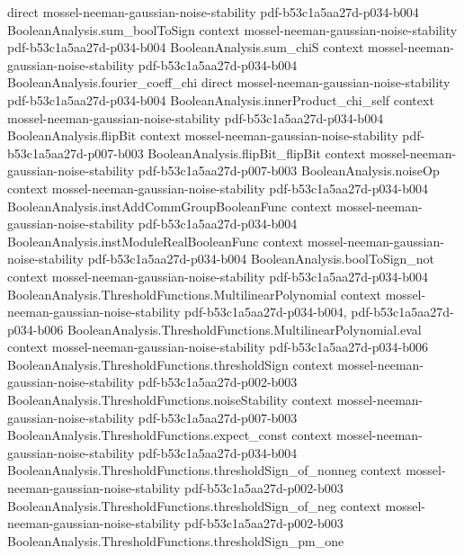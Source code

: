 \begin{theorem}
  {direct}
  {mossel-neeman-gaussian-noise-stability}
  {pdf-b53c1a5aa27d-p034-b004}
\proofstep
  {BooleanAnalysis.sum_boolToSign}
  {context}
  {mossel-neeman-gaussian-noise-stability}
  {pdf-b53c1a5aa27d-p034-b004}
\proofstep
  {BooleanAnalysis.sum_chiS}
  {context}
  {mossel-neeman-gaussian-noise-stability}
  {pdf-b53c1a5aa27d-p034-b004}
\proofstep
  {BooleanAnalysis.fourier_coeff_chi}
  {direct}
  {mossel-neeman-gaussian-noise-stability}
  {pdf-b53c1a5aa27d-p034-b004}
\proofstep
  {BooleanAnalysis.innerProduct_chi_self}
  {context}
  {mossel-neeman-gaussian-noise-stability}
  {pdf-b53c1a5aa27d-p034-b004}
\proofstep
  {BooleanAnalysis.flipBit}
  {context}
  {mossel-neeman-gaussian-noise-stability}
  {pdf-b53c1a5aa27d-p007-b003}
\proofstep
  {BooleanAnalysis.flipBit_flipBit}
  {context}
  {mossel-neeman-gaussian-noise-stability}
  {pdf-b53c1a5aa27d-p007-b003}
\proofstep
  {BooleanAnalysis.noiseOp}
  {context}
  {mossel-neeman-gaussian-noise-stability}
  {pdf-b53c1a5aa27d-p034-b004}
\proofstep
  {BooleanAnalysis.instAddCommGroupBooleanFunc}
  {context}
  {mossel-neeman-gaussian-noise-stability}
  {pdf-b53c1a5aa27d-p034-b004}
\proofstep
  {BooleanAnalysis.instModuleRealBooleanFunc}
  {context}
  {mossel-neeman-gaussian-noise-stability}
  {pdf-b53c1a5aa27d-p034-b004}
\proofstep
  {BooleanAnalysis.boolToSign_not}
  {context}
  {mossel-neeman-gaussian-noise-stability}
  {pdf-b53c1a5aa27d-p034-b004}
\proofstep
  {BooleanAnalysis.ThresholdFunctions.MultilinearPolynomial}
  {context}
  {mossel-neeman-gaussian-noise-stability}
  {pdf-b53c1a5aa27d-p034-b004,
    pdf-b53c1a5aa27d-p034-b006}
\proofstep
  {BooleanAnalysis.ThresholdFunctions.MultilinearPolynomial.eval}
  {context}
  {mossel-neeman-gaussian-noise-stability}
  {pdf-b53c1a5aa27d-p034-b006}
\proofstep
  {BooleanAnalysis.ThresholdFunctions.thresholdSign}
  {context}
  {mossel-neeman-gaussian-noise-stability}
  {pdf-b53c1a5aa27d-p002-b003}
\proofstep
  {BooleanAnalysis.ThresholdFunctions.noiseStability}
  {context}
  {mossel-neeman-gaussian-noise-stability}
  {pdf-b53c1a5aa27d-p007-b003}
\proofstep
  {BooleanAnalysis.ThresholdFunctions.expect_const}
  {context}
  {mossel-neeman-gaussian-noise-stability}
  {pdf-b53c1a5aa27d-p034-b004}
\proofstep
  {BooleanAnalysis.ThresholdFunctions.thresholdSign_of_nonneg}
  {context}
  {mossel-neeman-gaussian-noise-stability}
  {pdf-b53c1a5aa27d-p002-b003}
\proofstep
  {BooleanAnalysis.ThresholdFunctions.thresholdSign_of_neg}
  {context}
  {mossel-neeman-gaussian-noise-stability}
  {pdf-b53c1a5aa27d-p002-b003}
\proofstep
  {BooleanAnalysis.ThresholdFunctions.thresholdSign_pm_one}

\end{theorem}
